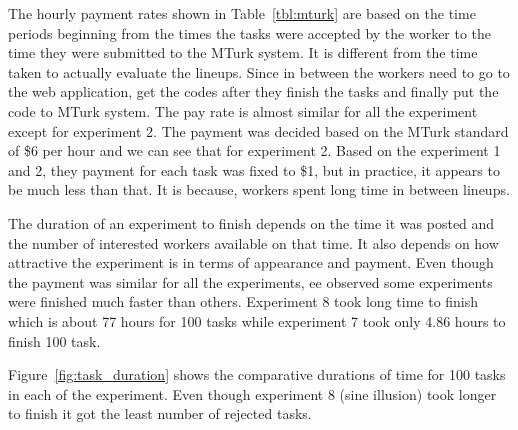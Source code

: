 \documentclass[11pt]{article}
\begin{document}
The hourly payment rates shown in Table~\ref{tbl:mturk} are based on the time periods beginning from the times the tasks were accepted by the worker to the time they were submitted to the MTurk system. It is different from the time taken to actually evaluate the lineups. Since in between the workers need to go to the web application, get the codes after they finish the tasks and finally put the code to MTurk system. The pay rate is almost similar for all the experiment except for experiment 2. The payment was decided based on the MTurk standard of \$6 per hour and we can see that for experiment 2. Based on the experiment 1 and 2, they payment for each task was fixed to \$1, but in practice, it appears to be much less than that. It is because, workers spent long time in between lineups.


The duration of an experiment to finish depends on the time it was posted and the number of interested workers available on that time. It also depends on how attractive the experiment is in terms of appearance and payment. Even though the payment was similar for all the experiments, ee observed some experiments were finished much faster than others. Experiment 8 took long time to finish which is about 77 hours for 100 tasks while experiment 7 took only 4.86 hours to finish 100 task.

Figure~\ref{fig:task_duration} shows the comparative durations of time for 100 tasks in each of the experiment. Even though experiment 8 (sine illusion) took longer to finish it got the least number of rejected tasks.
\end{document}
